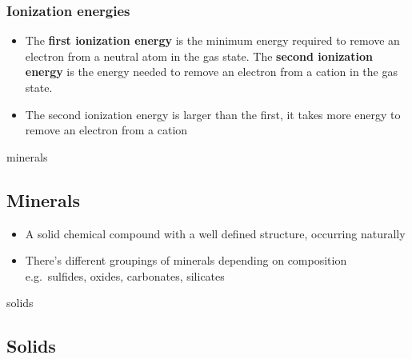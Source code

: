\documentclass[12pt]{article}
\begin{document}
\subsubsection{Ionization energies}\label{ionization-energies}

    \begin{itemize}
    \item
      The \textbf{first ionization energy} is the minimum energy required to
      remove an electron from a neutral atom in the gas state. The
      \textbf{second ionization energy} is the energy needed to remove an
      electron from a cation in the gas state.
    \item
      The second ionization energy is larger than the first, it takes more
      energy to remove an electron from a cation
    \end{itemize}

 {minerals}{%
\subsection{Minerals}\label{minerals}}

\begin{itemize}
\item
  A solid chemical compound with a well defined structure, occurring
  naturally
\item
  There's different groupings of minerals depending on composition
  e.g.~sulfides, oxides, carbonates, silicates
\end{itemize}

 {solids}{%
\subsection{Solids}\label{solids}}
\end{document}
